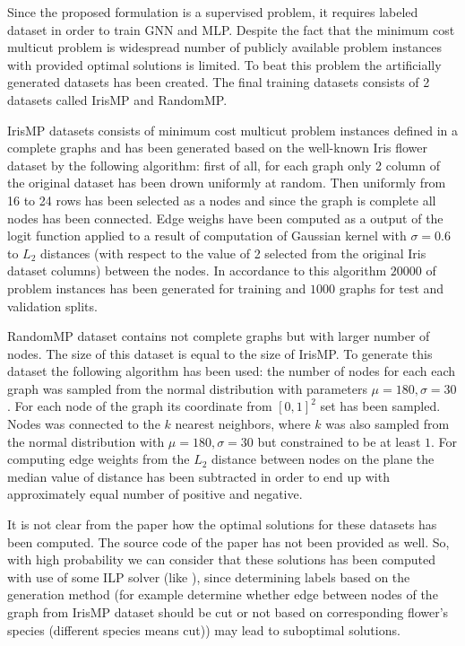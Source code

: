 \documentclass[10pt, twocolumn, a4paper]{article}
\theoremstyle{definition}
\begin{document}
Since the proposed formulation is a supervised problem, it requires labeled dataset in order to train
GNN and MLP. Despite the fact that the minimum cost multicut problem is widespread number of publicly available
problem instances with provided optimal solutions is limited. To beat this problem the artificially generated
datasets has been created. The final training datasets consists of 2 datasets called IrisMP and RandomMP.

IrisMP datasets consists of minimum cost multicut problem instances defined in a complete graphs and
has been generated based on the well-known Iris flower dataset \citet{fisher1936use} by the
following algorithm: first of all, for each graph only 2 column of the original dataset has been drown
uniformly at random. Then uniformly from 16 to 24 rows has been selected as a nodes and since the graph is complete
all nodes has been connected. Edge weighs have been computed as a output of the logit function applied to
a result of computation of Gaussian kernel with $\sigma = 0.6$ to $L_2$ distances (with respect to the
value of 2 selected from the original Iris dataset columns) between the nodes. In accordance to this
algorithm $20000$ of problem instances has been generated for training and $1000$ graphs for test and
validation splits.

RandomMP dataset contains not complete graphs but with larger number of nodes. The size of this dataset
is equal to the size of IrisMP. To generate this dataset the following algorithm has been used:
the number of nodes for each each graph was sampled from the normal distribution with parameters
$\mu = 180, \sigma = 30$. For each node of the graph its coordinate from $[0, 1]^2$ set has been sampled.
Nodes was connected to the $k$ nearest neighbors, where $k$ was also sampled from the normal distribution with
$\mu = 180, \sigma = 30$ but constrained to be at least $1$. For computing edge weights from the $L_2$ distance
between nodes on the plane the median value of distance has been subtracted in order to end up
with approximately equal number of positive and negative.

It is not clear from the paper how the optimal solutions for these datasets has been computed.
The source code of the paper has not been provided as well. So, with high probability we can consider
that these solutions has been computed with use of some ILP solver (like \citet{gurobi}), since
determining labels based on the generation method (for example determine whether edge between nodes of the graph from IrisMP
dataset should be cut or not based on corresponding flower's species (different species means cut)) may lead to suboptimal solutions.
\end{document}
